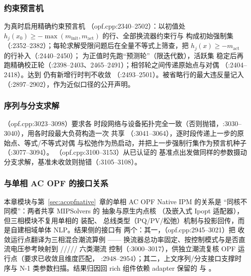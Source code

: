 \subsubsection*{约束预言机}
 为真时启用精确约束预言机
（opf.cpp:2340--2502）：以初值处 $h_j(x_0)\ge -\max(m_{\mathrm{init}},m_{\mathrm{act}})$
的行、全部换流器约束行与  构成初始强制集
（:2352--2382）；每轮求解受限问题后在全量不等式上筛查，把
$h_j(x)\ge -m_{\mathrm{act}}$ 的行补入（:2440--2450）；
 为正值时先跑“预测轮”（限迭代数），活跃集
稳定后再跑精确校正轮（:2398--2403、2465--2491）；相邻轮之间传递原始点与对偶
（:2404--2418）。达到  仍有新增行时判不收敛
（:2493--2501）。被省略行的最大违反量记入 
（:2897--2902），作为近似口径的公开声明。

\subsubsection*{序列与分支求解}
（opf.cpp:3023--3098）要求各
时段网络与设备拓扑完全一致（否则抛错，:3030--3040），用各时段最大负荷构造一次
共享 （:3041--3064），逐时段传递上一步的原始点、等式/不等式对偶
与松弛作为热启动，并把上一步强制行集作为预言机种子（:3077--3094）。
（opf.cpp:3100--3153）从已认证的
基准点出发做同样的参数摄动分支求解，基准未收敛则抛错（:3105--3108）。

\subsubsection*{与单相 AC OPF 的接口关系}
本章模块与第~\ref{sec:acopfnative}~章的单相 AC OPF Native IPM 的关系是
“同核不同模”：两者共享 MIPSolvers 的  抽象与原生内点核
（及嵌入式 Ipopt 适配器），但三相模块不复用单相的  装配、
总线类型（PQ/PV/松弛）机制与投影回传，而是自建相域单体 NLP。结果侧的接口有
两个：其一，（opf.cpp:2945--3021）把
收敛运行点翻译为三相混合潮流算例 ——
换流器总功率固定、按控制模式与是否直流电压参考映射到
\allowbreak /\allowbreak /\allowbreak /\allowbreak /\allowbreak / 六类潮流
控制（:3000--3017），供独立潮流复核 OPF 运行点（要求已收敛且维度匹配，
:2948--2954）；其二，上文序列/分支接口支撑时序与 N-1 类参数扫描。结果归因回
rich 组件依赖 adapter 保留的  与
。

